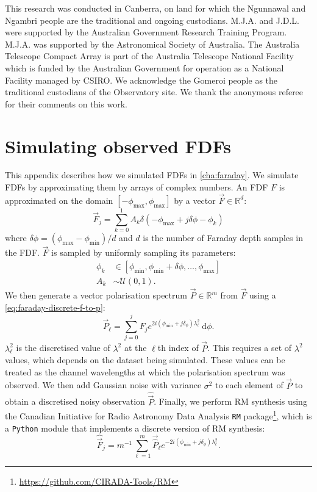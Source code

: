 This research was conducted in Canberra, on land for which the Ngunnawal and Ngambri people are the traditional and ongoing custodians. M.J.A. and J.D.L. were supported by the Australian Government Research Training Program. M.J.A. was supported by the Astronomical Society of Australia. The Australia Telescope Compact Array is part of the Australia Telescope National Facility which is funded by the Australian Government for operation as a National Facility managed by CSIRO. We acknowledge the Gomeroi people as the traditional custodians of the Observatory site. We thank the anonymous referee for their comments on this work.


\appendix

\section{Simulating observed FDFs}
\label{sec:faraday-simulating}

  This appendix describes how we simulated FDFs in \autoref{cha:faraday}. We simulate FDFs by approximating them by arrays of complex numbers. An FDF $F$ is approximated on the domain $[-\phi_{\max}, \phi_{\max}]$ by a vector $\vec F \in \mathbb R^d$:
    \begin{equation}
      \label{eq:faraday-vec-f}
      \vec F_j = \sum_{k = 0}^1 A_k \delta(-\phi_{\max} + j \delta \phi - \phi_k)
    \end{equation}
    where $\delta\phi = (\phi_{\max} - \phi_{\min}) / d$ and $d$ is the number of Faraday depth samples in the FDF.
    $\vec F$ is sampled by uniformly sampling its parameters:
    \begin{align}
      \label{eq:faraday-model-distributions}
      \phi_k &\in [\phi_{\min}, \phi_{\min} + \delta\phi, \dots, \phi_{\max}]\\
      A_k &\sim \mathcal U(0, 1).
    \end{align}
    We then generate a vector polarisation spectrum $\vec P \in \mathbb R^m$ from $\vec F$ using a \autoref{eq:faraday-discrete-f-to-p}:
    \begin{equation}
      \label{eq:faraday-discrete-f-to-p}
      \vec P_\ell = \sum_{j = 0}^{j} F_j e^{2i(\phi_{\min} + j\delta_\phi)\lambda^2_\ell}\ \mathrm{d}\phi.
    \end{equation}
    $\lambda^2_\ell$ is the discretised value of $\lambda^2$ at the $\ell$th index of $\vec P$. This requires a set of $\lambda^2$ values, which depends on the dataset being simulated. These values can be treated as the channel wavelengths at which the polarisation spectrum was observed. We then add Gaussian noise with variance $\sigma^2$ to each element of $\vec P$ to obtain a discretised noisy observation $\hat{\vec{P}}$. Finally, we perform RM synthesis using the Canadian Initiative for Radio Astronomy Data Analysis \texttt{RM} package\footnote{\url{https://github.com/CIRADA-Tools/RM}}, which is a \texttt{Python} module that implements a discrete version of RM synthesis:
    \begin{equation}
      \label{eq:faraday-discrete-rm-synthesis}
      \hat{\vec{F}}_j = m^{-1} \sum_{\ell = 1}^m \vec{\hat P}_\ell e^{-2i(\phi_{\min} + j\delta_\phi)\lambda^2_\ell}.
    \end{equation}


